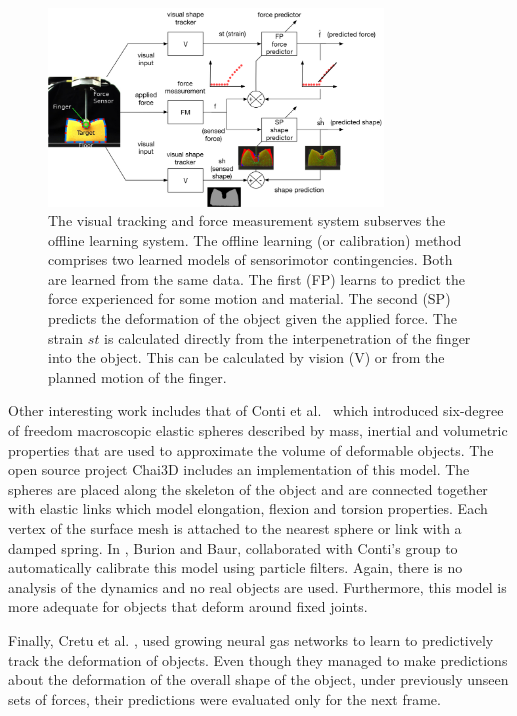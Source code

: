 \documentclass[journal]{IEEEtran}
\newcommand{\comment}[1]{{\color{red} #1}}
\begin{document}
\begin{figure}[!t]
\centering
\includegraphics[width=3.5in]{figures/learning.png}%
\caption{\comment{The visual tracking and force measurement system subserves the offline learning system. The offline learning (or calibration) method comprises two learned models of sensorimotor contingencies.} Both are learned from the same data. The first (FP) learns to predict the force experienced for some motion and material. The second (SP) predicts the deformation of the object given the applied force. The strain $st$ is calculated directly from the interpenetration of the finger into the object. This can be calculated by vision (V) or from the planned motion of the finger.}
\label{fig:learning}
\end{figure}

Other interesting work includes that of Conti et al.\ \cite{Conti2003} which introduced six-degree of freedom macroscopic elastic spheres described by mass, inertial and volumetric properties that are used to approximate the volume of deformable objects. The open source project Chai3D includes an implementation of this model. The spheres are placed along the skeleton of the object and are connected together with elastic links which model elongation, flexion and torsion properties. Each vertex of the surface mesh is attached to the nearest sphere or link with a damped spring.  In \cite{Burion2008}, Burion and Baur, collaborated with Conti's group to automatically calibrate this model using particle filters.  Again, there is no analysis of the dynamics and no real objects are used.  Furthermore, this model is more adequate for objects that deform around fixed joints.

Finally, Cretu et al. \cite{Cretu2012}, used growing neural gas networks to learn to predictively track the deformation of objects.  Even though they managed to make predictions about the deformation of the overall shape of the object, under previously unseen sets of forces, their predictions were evaluated only for the next frame.
\end{document}
